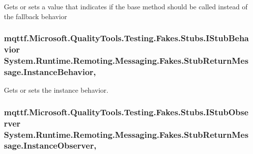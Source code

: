 Gets or sets a value that indicates if the base method should be called instead of the fallback behavior

\hypertarget{class_system_1_1_runtime_1_1_remoting_1_1_messaging_1_1_fakes_1_1_stub_return_message_a868e560b2d7f52c5276a756aa043efc8}{
\subsubsection[{Instance\-Behavior}]{\setlength{\rightskip}{0pt plus 5cm}mqttf.\-Microsoft.\-Quality\-Tools.\-Testing.\-Fakes.\-Stubs.\-I\-Stub\-Behavior System.\-Runtime.\-Remoting.\-Messaging.\-Fakes.\-Stub\-Return\-Message.\-Instance\-Behavior\hspace{0.3cm}{\ttfamily [get]}, {\ttfamily [set]}}}\label{class_system_1_1_runtime_1_1_remoting_1_1_messaging_1_1_fakes_1_1_stub_return_message_a868e560b2d7f52c5276a756aa043efc8}


Gets or sets the instance behavior.

\hypertarget{class_system_1_1_runtime_1_1_remoting_1_1_messaging_1_1_fakes_1_1_stub_return_message_aea4708b41201ed7ddc1f3c789c773f2c}{
\subsubsection[{Instance\-Observer}]{\setlength{\rightskip}{0pt plus 5cm}mqttf.\-Microsoft.\-Quality\-Tools.\-Testing.\-Fakes.\-Stubs.\-I\-Stub\-Observer System.\-Runtime.\-Remoting.\-Messaging.\-Fakes.\-Stub\-Return\-Message.\-Instance\-Observer\hspace{0.3cm}{\ttfamily [get]}, {\ttfamily [set]}}}\label{class_system_1_1_runtime_1_1_remoting_1_1_messaging_1_1_fakes_1_1_stub_return_message_aea4708b41201ed7ddc1f3c789c773f2c}



